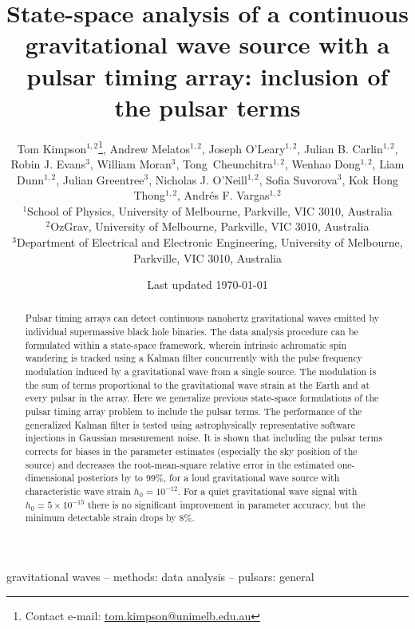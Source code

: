\documentclass[fleqn,usenatbib,useAMS]{mnras}
\title[State-space PTA]{State-space analysis of a continuous gravitational wave source with a pulsar timing array: inclusion of the pulsar terms}
\author[Kimpson]{Tom Kimpson$^{1,2}$\thanks{Contact e-mail: \href{tom.kimpson@unimelb.edu.au}{tom.kimpson@unimelb.edu.au}}, Andrew Melatos$^{1,2}$, Joseph O'Leary$^{1,2}$, Julian B. Carlin$^{1,2}$, Robin J. Evans$^{3}$, \newauthor William Moran$^{3}$, Tong Cheunchitra$^{1,2}$, Wenhao Dong$^{1,2}$, Liam Dunn$^{1,2}$, Julian Greentree$^{3}$, Nicholas J. O'Neill$^{1,2}$, \newauthor Sofia Suvorova$^{3}$, Kok Hong Thong$^{1,2}$, Andrés F. Vargas$^{1,2}$%
\\
$^{1}$School of Physics, University of Melbourne, Parkville, VIC 3010, Australia \\
$^{2}$OzGrav, University of Melbourne, Parkville, VIC 3010, Australia \\
$^{3}$Department of Electrical and Electronic Engineering, University of Melbourne, Parkville, VIC 3010, Australia }
\date{Last updated \today}
\begin{document}
\label{firstpage}
\pagerange{\pageref{firstpage}--\pageref{lastpage}}
\maketitle

\begin{abstract}	
	 Pulsar timing arrays can detect continuous nanohertz gravitational waves emitted by individual supermassive black hole binaries. The data analysis procedure can be formulated within a state-space framework, wherein intrinsic achromatic spin wandering is tracked using a Kalman filter concurrently with the pulse frequency modulation induced by a gravitational wave from a single source. The modulation is the sum of terms proportional to the gravitational wave strain at the Earth and at every pulsar in the array. Here we generalize previous state-space formulations of the pulsar timing array problem to include the pulsar terms. The performance of the generalized Kalman filter is tested using astrophysically representative software injections in Gaussian measurement noise. It is shown that including the pulsar terms corrects for biases in the parameter estimates (especially the sky position of the source) and decreases the root-mean-square relative error in the estimated one-dimensional posteriors by to 99\%, for a loud gravitational wave source with characteristic wave strain $h_0 = 10^{-12}$. For a quiet gravitational wave signal with $h_0 = 5 \times 10^{-15}$ there is no significant improvement in parameter accuracy, but the minimum detectable strain drops by $8\%$.
\end{abstract}

\begin{keywords}
gravitational waves -- methods: data analysis -- pulsars: general
\end{keywords}



\begingroup
\let\clearpage\relax
\endgroup
\newpage
\end{document}
